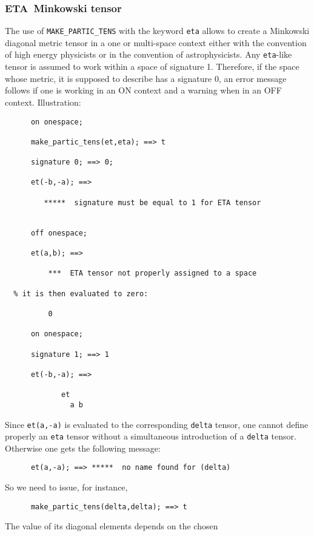 \subsubsection{ETA\ Minkowski tensor}
The use of \texttt{MAKE\_PARTIC\_TENS} with the 
keyword \texttt{eta} allows to create a Minkowski diagonal metric tensor in a 
one or multi-space context either with the convention of
 high energy physicists or in the convention of astrophysicists.
Any \texttt{eta}-like tensor is assumed to work within a space 
of signature 1. Therefore, if the space whose metric, it is supposed 
to describe has a signature 0, an error message follows if one is 
working in an ON   
context and a warning when in an OFF  context.
Illustration:
\begin{verbatim}
      on onespace;

      make_partic_tens(et,eta); ==> t

      signature 0; ==> 0;

      et(-b,-a); ==> 

         *****  signature must be equal to 1 for ETA tensor


      off onespace;

      et(a,b); ==> 
 
          ***  ETA tensor not properly assigned to a space

  % it is then evaluated to zero:

          0

      on onespace;   

      signature 1; ==> 1

      et(-b,-a); ==> 

             et
               a b 
\end{verbatim}
Since \texttt{et(a,-a)} is evaluated to the corresponding \texttt{delta} tensor,
 one cannot define properly an \texttt{eta} tensor without a 
simultaneous introduction of a  \texttt{delta} tensor. Otherwise one gets 
the following message:
\begin{verbatim}
      et(a,-a); ==> *****  no name found for (delta)
\end{verbatim}
So we need to issue, for instance, 
\begin{verbatim}
      make_partic_tens(delta,delta); ==> t
\end{verbatim}
The value of its diagonal elements depends on the chosen
